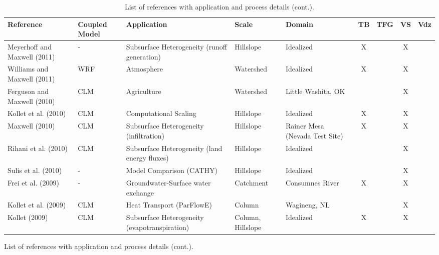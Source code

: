 {\begin{table} \center
\renewcommand{\arraystretch}{2.5}
\center

\caption{List of \parflow{} references with application and process details (cont.).}

\begin{tabular}{ l  p{1.5cm} p{2cm} p{1.5cm} p{1.5cm} | c | c | c | c }
\bf{Reference} & \bf{Coupled Model} & \bf{Application} & \bf{Scale} & \bf{Domain} & \bf{TB} & \bf{TFG} & \bf{VS} & \bf{Vdz} \\ 
\hline{}
   
\cite{Meyerhoff11} Meyerhoff and Maxwell (2011) & - & Subsurface Heterogeneity (runoff generation) & Hillslope  & Idealized  & X &   & X &     \\
\cite{Williams11} Williams and Maxwell (2011) & WRF & Atmosphere & Watershed & Idealized & X &   & X &     \\
\cite{FM10} Ferguson and Maxwell (2010) & CLM & Agriculture & Watershed & Little Washita, OK &   &   & X &     \\
\cite{KMWSVVS10} Kollet et al. (2010) & CLM & Computational Scaling & Hillslope & Idealized & X &   & X &     \\
\cite{M10} Maxwell (2010) & CLM & Subsurface Heterogeneity (infiltration) & Hillslope & Rainer Mesa (Nevada Test Site) & X &   & X &     \\
\cite{RMC10} Rihani et al. (2010) & CLM & Subsurface Heterogeneity (land energy fluxes) & Hillslope & Idealized  &   &   & X &     \\
\cite{SMPMPK10} Sulis et al. (2010) & - & Model Comparison (CATHY) & Hillslope & Idealized &   &   & X &     \\
\cite{FFKM09} Frei et al. (2009) & - & Groundwater-Surface water exchange & Catchment & Consumnes River & X &   & X &     \\
\cite{KCSMMB09} Kollet et al. (2009) & CLM & Heat Transport (ParFlowE) & Column & Wagineng, NL &   &   & X &     \\
\cite{K09} Kollet (2009) & CLM & Subsurface Heterogeneity (evapotranspiration) & Column, Hillslope & Idealized & X &   & X &     \\
\end{tabular}
\label{pfref3}
\end{table}

\begin{table} \center
\renewcommand{\arraystretch}{2.5}
\center

\caption{List of \parflow{} references with application and process details (cont.).}


\end{table}}
